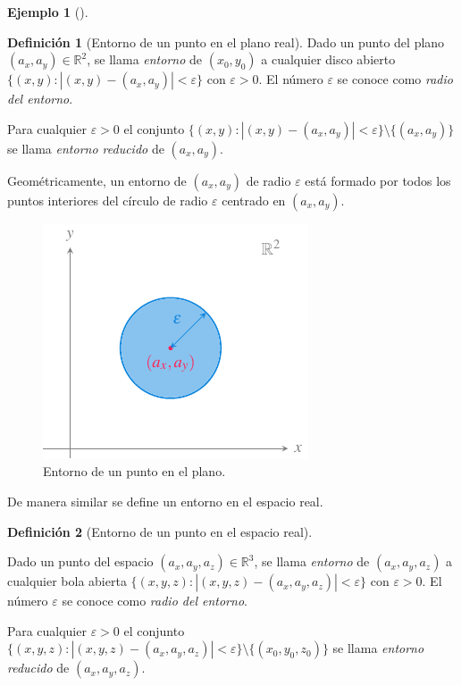 \documentclass[
  a4paper,
]{scrreport}
\theoremstyle{definition}
\newtheorem{example}{Ejemplo}[chapter]
\theoremstyle{plain}
\theoremstyle{definition}
\newtheorem{definition}{Definición}[chapter]
\theoremstyle{definition}
\theoremstyle{plain}
\theoremstyle{plain}
\theoremstyle{remark}
\begin{document}
\begin{example}[]
\begin{definition}[Entorno de un punto en el plano
real]
Dado un punto del plano \((a_x,a_y)\in \mathbb{R}^2\), se llama
\emph{entorno} de \((x_0,y_0)\) a cualquier disco abierto
\(\{(x,y):|(x,y)-(a_x,a_y)|<\varepsilon\}\) con \(\varepsilon>0\). El
número \(\varepsilon\) se conoce como \emph{radio del entorno}.

Para cualquier \(\varepsilon>0\) el conjunto
\(\{(x,y):|(x,y)-(a_x,a_y)|<\varepsilon\}\setminus \{(a_x,a_y)\}\) se
llama \emph{entorno reducido} de \((a_x,a_y)\).

\end{definition}

Geométricamente, un entorno de \((a_x,a_y)\) de radio \(\varepsilon\)
está formado por todos los puntos interiores del círculo de radio
\(\varepsilon\) centrado en \((a_x,a_y)\).

\begin{figure}[H]

{\centering \includegraphics{img/derivadas-funciones-varias-variables/entorno-punto-plano.pdf}

}

\caption{Entorno de un punto en el plano.}

\end{figure}%

De manera similar se define un entorno en el espacio real.

\begin{definition}[Entorno de un punto en el espacio
real]\protect\hypertarget{def-entorno-punto-espacio}{}\label{def-entorno-punto-espacio}

Dado un punto del espacio \((a_x,a_y,a_z)\in \mathbb{R}^3\), se llama
\emph{entorno} de \((a_x,a_y,a_z)\) a cualquier bola abierta
\(\{(x,y,z):|(x,y,z)-(a_x,a_y,a_z)|<\varepsilon\}\) con
\(\varepsilon>0\). El número \(\varepsilon\) se conoce como \emph{radio
del entorno}.

Para cualquier \(\varepsilon>0\) el conjunto
\(\{(x,y,z):|(x,y,z)-(a_x,a_y,a_z)|<\varepsilon\}\setminus \{(x_0,y_0,z_0)\}\)
se llama \emph{entorno reducido} de \((a_x,a_y,a_z)\).


\end{definition}
\end{example}
\end{document}
